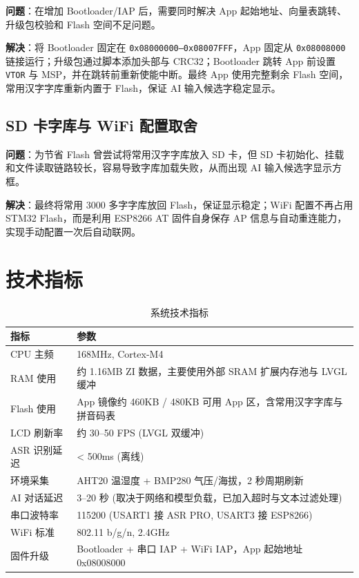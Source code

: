 \documentclass[12pt,a4paper]{ctexart}
\begin{document}
\textbf{问题}：在增加 Bootloader/IAP 后，需要同时解决 App 起始地址、向量表跳转、升级包校验和 Flash 空间不足问题。

\textbf{解决}：将 Bootloader 固定在 \texttt{0x08000000--0x08007FFF}，App 固定从 \texttt{0x08008000} 链接运行；升级包通过脚本添加头部与 CRC32；Bootloader 跳转 App 前设置 \texttt{VTOR} 与 MSP，并在跳转前重新使能中断。最终 App 使用完整剩余 Flash 空间，常用汉字字库重新内置于 Flash，保证 AI 输入候选字稳定显示。

\subsection{SD 卡字库与 WiFi 配置取舍}

\textbf{问题}：为节省 Flash 曾尝试将常用汉字字库放入 SD 卡，但 SD 卡初始化、挂载和文件读取链路较长，容易导致字库加载失败，从而出现 AI 输入候选字显示方框。

\textbf{解决}：最终将常用 3000 多字字库放回 Flash，保证显示稳定；WiFi 配置不再占用 STM32 Flash，而是利用 ESP8266 AT 固件自身保存 AP 信息与自动重连能力，实现手动配置一次后自动联网。


\section{技术指标}

\begin{table}[H]
\centering
\begin{tabularx}{\textwidth}{lX}
\toprule
\textbf{指标} & \textbf{参数} \\
\midrule
CPU 主频 & 168MHz, Cortex-M4 \\
RAM 使用 & 约 1.16MB ZI 数据，主要使用外部 SRAM 扩展内存池与 LVGL 缓冲 \\
Flash 使用 & App 镜像约 460KB / 480KB 可用 App 区，含常用汉字字库与拼音码表 \\
LCD 刷新率 & 约 30--50 FPS (LVGL 双缓冲) \\
ASR 识别延迟 & < 500ms (离线) \\
环境采集 & AHT20 温湿度 + BMP280 气压/海拔，2 秒周期刷新 \\
AI 对话延迟 & 3--20 秒 (取决于网络和模型负载，已加入超时与文本过滤处理) \\
串口波特率 & 115200 (USART1 接 ASR PRO, USART3 接 ESP8266) \\
WiFi 标准 & 802.11 b/g/n, 2.4GHz \\
固件升级 & Bootloader + 串口 IAP + WiFi IAP，App 起始地址 0x08008000 \\
\bottomrule
\end{tabularx}
\caption{系统技术指标}
\end{table}
\end{document}

